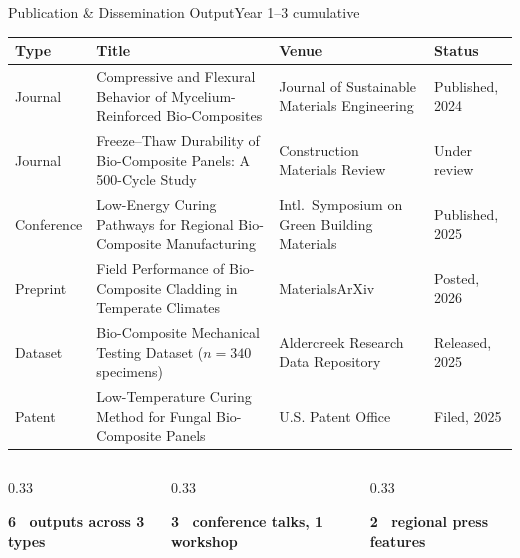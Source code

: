 \begin{frame}{Publication \& Dissemination Output}{Year 1--3 cumulative}
\scriptsize
\renewcommand{\arraystretch}{1.0}
\begin{tabularx}{\linewidth}{@{}p{2.1cm}Xp{3.0cm}p{2.0cm}@{}}
\toprule
\textbf{Type} & \textbf{Title} & \textbf{Venue} & \textbf{Status} \\
\midrule
Journal &
  Compressive and Flexural Behavior of Mycelium-Reinforced Bio-Composites &
  Journal of Sustainable Materials Engineering &
  Published, 2024 \\
Journal &
  Freeze--Thaw Durability of Bio-Composite Panels: A 500-Cycle Study &
  Construction Materials Review &
  Under review \\
Conference &
  Low-Energy Curing Pathways for Regional Bio-Composite Manufacturing &
  Intl.\ Symposium on Green Building Materials &
  Published, 2025 \\
Preprint &
  Field Performance of Bio-Composite Cladding in Temperate Climates &
  MaterialsArXiv &
  Posted, 2026 \\
Dataset &
  Bio-Composite Mechanical Testing Dataset ($n=340$ specimens) &
  Aldercreek Research Data Repository &
  Released, 2025 \\
Patent &
  Low-Temperature Curing Method for Fungal Bio-Composite Panels &
  U.S. Patent Office &
  Filed, 2025 \\
\bottomrule
\end{tabularx}

\par\vspace{1pt}
\begin{columns}[T,onlytextwidth]
\begin{column}{0.33\textwidth}
\begin{tcolorbox}[infobox, title=\faFile\ Written Output, top=1pt, bottom=1pt]
\centering \small\bfseries 6 \tiny\ outputs across 3 types
\end{tcolorbox}
\end{column}
\begin{column}{0.33\textwidth}
\begin{tcolorbox}[infobox, title=\faUsers\ Presentations, top=1pt, bottom=1pt]
\centering \small\bfseries 3 \tiny\ conference talks, 1 workshop
\end{tcolorbox}
\end{column}
\begin{column}{0.33\textwidth}
\begin{tcolorbox}[infobox, title=\faGlobe\ Media, top=1pt, bottom=1pt]
\centering \small\bfseries 2 \tiny\ regional press features
\end{tcolorbox}
\end{column}
\end{columns}
\end{frame}
